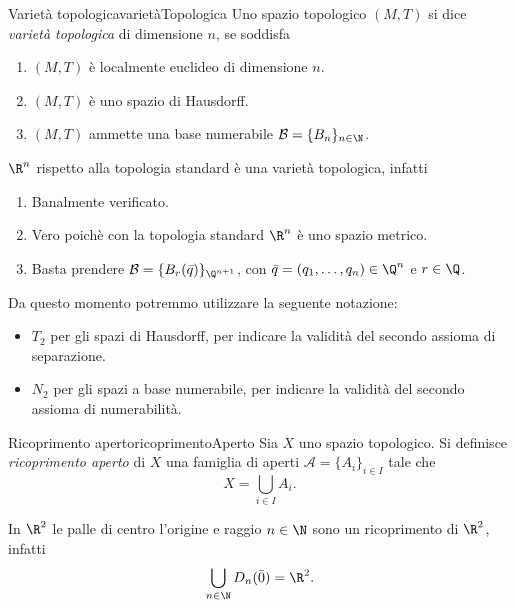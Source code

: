 \begin{defn}{Varietà topologica}{varietàTopologica}
	Uno spazio topologico \((M,T)\) si dice \emph{varietà topologica} di dimensione \(n\), se soddisfa
	\begin{enumerate}
		\item \((M,T)\) è localmente euclideo di dimensione \(n\).
		\item \((M,T)\) è uno spazio di Hausdorff.
		\item \((M,T)\) ammette una base numerabile \(\mathcal{B}=\{B_n\}_{n\in \N}\).
	\end{enumerate}
\end{defn}

\begin{ese}
	\(\R^n\) rispetto alla topologia standard è una varietà topologica, infatti
	\begin{enumerate}
		\item Banalmente verificato.
		\item Vero poichè con la topologia standard \(\R^n\) è uno spazio metrico.
		\item Basta prendere \(\mathcal{B}=\{B_r(\bar{q})\}_{\Q^{n+1}}\), con \(\bar{q}=(q_1,\dots,q_n)\in\Q^n\) e \(r\in \Q\).
	\end{enumerate}
\end{ese}
%
%
\begin{notz}
	Da questo momento potremmo utilizzare la seguente notazione:
	\begin{itemize}
		\item \(T_2\) per gli spazi di Hausdorff, per indicare la validità del secondo assioma di separazione.
		\item \(N_2\) per gli spazi a base numerabile, per indicare la validità del secondo assioma di numerabilità.
	\end{itemize}
\end{notz}

\begin{defn}{Ricoprimento aperto}{ricoprimentoAperto}
	Sia \(X\) uno spazio topologico.
	Si definisce \emph{ricoprimento aperto} di \(X\) una famiglia di aperti \(\mathcal{A}=\{A_i\}_{i\in I}\) tale che
	\[
		X=\bigcup_{i\in I}A_i.
	\]
\end{defn}

\begin{ese}
	In \(\R^2\) le palle di centro l'origine e raggio \(n\in\N\) sono un ricoprimento di \(\R^2\), infatti
	\[
		\bigcup_{n\in\N}D_n(\bar{0})=\R^2.
	\]
\end{ese}

